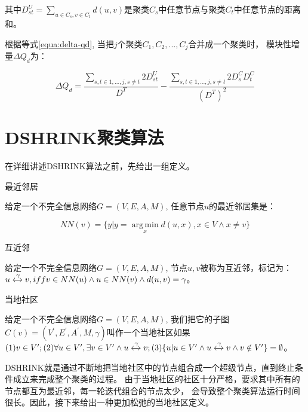 其中$D_{st}^U = \sum_{u \in C_s, v \in C_t} d(u,v)$是聚类$C_s$中任意节点与聚类$C_t$中任意节点的距离和。

根据等式\ref{equa:delta-qd}, 当把$j$个聚类$C_1, C_2, ..., C_j$合并成一个聚类时，
模块性增量$\Delta Q_d$为：

\begin{equation}
\label{equa:delta-qd2}
\Delta Q_d = \frac{\sum_{s,t \in {1,...,j}, s \neq t }2D_{st}^U}{D^T} - \frac{\sum_{s,t \in {1,...,j}, s \neq t }2D_s^CD_t^C}{(D^T)^2}
\end{equation}

\section{DSHRINK聚类算法}

在详细讲述DSHRINK算法之前，先给出一组定义。

\begin{defn}{最近邻居}
    \label{defn:nearest-neighbor}

    给定一个不完全信息网络$G = (V, E, A, M)$,
    任意节点$u$的最近邻居集是：

    \begin{equation}
        NN(v) = \{y | y = \operatorname*{arg\,min}_x d(u, x), x \in V \wedge x \neq v\}
    \end{equation}

\end{defn}

\begin{defn}{互近邻}
    \label{defn:mnn}

    给定一个不完全信息网络$G = (V, E, A, M)$,
    节点$u, v$被称为互近邻，标记为：
    $ u \xleftrightarrow{\gamma} v, iff v \in NN(u) \wedge u \in NN(v) \wedge d(u, v) = \gamma$。

\end{defn}

\begin{defn}{当地社区}

    给定一个不完全信息网络$G = (V, E, A, M)$,
    我们把它的子图$C(v) = (V^\prime, E^\prime, A^\prime, M, \gamma)$叫作一个当地社区如果$
    (1) v \in V^\prime;
    (2) \forall u \in V^\prime, \exists v \in V^\prime \wedge u \xleftrightarrow{\gamma} v;
    (3) \{u | u \in V^\prime \wedge u \xleftrightarrow{\gamma} v \wedge v \notin V^\prime \} = \emptyset
    $。
    
\end{defn}

DSHRINK就是通过不断地把当地社区中的节点组合成一个超级节点，直到终止条件成立来完成整个聚类的过程。
由于当地社区的社区十分严格，要求其中所有的节点都互为最近邻，每一轮迭代组合的节点太少，
会导致整个聚类算法运行时间很长。因此，接下来给出一种更加松弛的当地社区定义。

